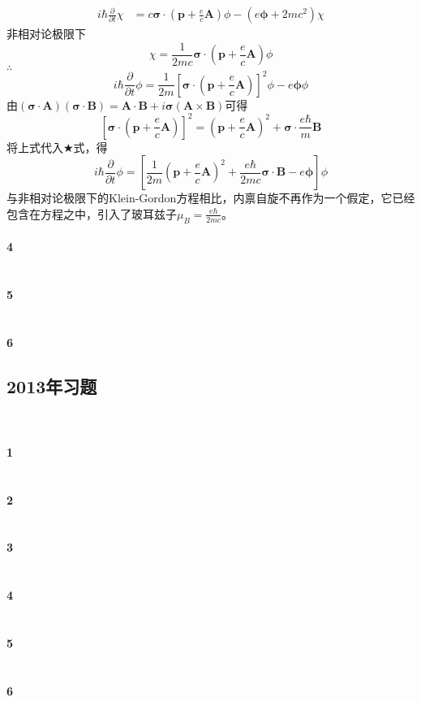 \documentclass[12pt]{article}
\numberwithin{equation}{section}	 %
\begin{document}
\begin{spacing}{1.5}
\begin{align*}
i\hbar\frac{\partial}{\partial t}\chi &= c\bm\sigma\cdot\left(\bm{p} +\frac{e}{c}\bm{A}\right)\phi - \left(e\bm\phi + 2mc^{2}\right)\chi
\end{align*}
非相对论极限下
\begin{equation}
\chi = \frac{1}{2mc}\bm\sigma\cdot\left(\bm{p} +\frac{e}{c}\bm{A}\right)\phi
\end{equation}
$\therefore$
\begin{equation}
i\hbar\frac{\partial}{\partial t}\phi = \frac{1}{2m}\left[\bm\sigma\cdot\left(\bm{p} +\frac{e}{c}\bm{A}\right)\right]^{2}\phi - e\bm\phi\phi 
	\tag{$\bigstar$}
\end{equation}
由$(\bm\sigma\cdot\bm{A})(\bm\sigma\cdot\bm{B})=\bm{A}\cdot\bm{B}+i\bm\sigma(\bm{A}\times\bm{B})$可得
\begin{equation}
\left[\bm\sigma\cdot\left(\bm{p} +\frac{e}{c}\bm{A}\right)\right]^{2} = \left(\bm{p} +\frac{e}{c}\bm{A}\right)^{2} + \bm\sigma\cdot\frac{e\hbar}{m}\bm{B}
\end{equation}
将上式代入$\bigstar$式，得
\begin{equation}
i\hbar\frac{\partial}{\partial t}\phi = \left[\frac{1}{2m}\left(\bm{p} +\frac{e}{c}\bm{A}\right)^{2} + \frac{e\hbar}{2mc}\bm\sigma\cdot\bm{B} -e\bm\phi \right]\phi
\end{equation}
与非相对论极限下的Klein-Gordon方程相比，内禀自旋不再作为一个假定，它已经包含在方程之中，引入了玻耳兹子$\displaystyle \mu_{B}=\frac{e\hbar}{2mc}$。
~\\
~\\
\textbf{4 \quad }\\
~\\
~\\
\textbf{5 \quad }\\
~\\
~\\
\textbf{6 \quad }\\


\newpage
\subsection{2013年习题}
~\\
~\\
\textbf{1 \quad }\\
~\\
~\\
\textbf{2 \quad }\\
~\\
~\\
\textbf{3 \quad }\\
~\\
~\\
\textbf{4 \quad }\\
~\\
~\\
\textbf{5 \quad }\\
~\\
~\\
\textbf{6 \quad }\\


\end{spacing}
\end{document}
